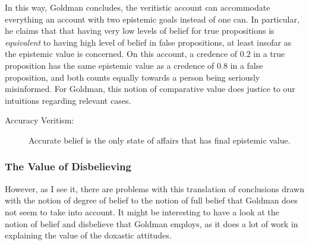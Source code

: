 \documentclass[12pt,numbers=noenddot]{scrartcl}
\begin{document}
In this way, Goldman concludes, the veritistic account can accommodate everything an account with two epistemic goals instead of one can. In particular, he claims that that having very low levels of belief for true propositions is \emph{equivalent} to having high level of belief in false propositions, at least insofar as the epistemic value is concerned. On this account, a credence of $0.2$ in a true proposition has the same epistemic value as a credence of $0.8$ in a false proposition, and both counts equally towards a person being seriously misinformed. For Goldman, this notion of comparative value does justice to our intuitions regarding relevant cases.

\begin{description}
    \item[Accuracy Veritism:] Accurate belief is the only state of affairs that has final epistemic value.
\end{description}

\subsubsection{The Value of Disbelieving}

However, as I see it, there are problems with this translation of conclusions drawn with the notion of degree of belief to the notion of full belief that Goldman does not seem to take into account. It might be interesting to have a look at the notion of belief and disbelieve that Goldman employs, as it does a lot of work in explaining the value of the doxastic attitudes.
\end{document}
